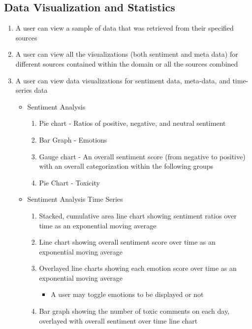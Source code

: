 \documentclass[12pt]{article}
\begin{document}
\subsection{Data Visualization and Statistics}
\begin{enumerate}
  \item A user can view a sample of data that was retrieved from their specified sources
  \item A user can view all the visualizations (both sentiment and meta data) for different sources contained within the domain or all the sources combined
  \item A user can view data visualizations for sentiment data, meta-data, and time-series data
        \begin{itemize}
          \item Sentiment Analysis
                \begin{enumerate}
                  \item Pie chart - Ratios of positive, negative, and neutral sentiment
                  \item Bar Graph - Emotions
                  \item Gauge chart - An overall sentiment score (from negative to positive) with an
                        overall categorization within the following groups
                  \item Pie Chart - Toxicity
                \end{enumerate}
          \item Sentiment Analysis Time Series
                \begin{enumerate}
                  \item Stacked, cumulative area line chart showing sentiment ratios over time as an exponential moving average
                  \item Line chart showing overall sentiment score over time as an exponential moving average
                  \item Overlayed line charts showing each emotion score over time as an exponential moving average \begin{itemize}
                    \item A user may toggle emotions to be displayed or not
                  \end{itemize}
                  \item Bar graph showing the number of toxic comments on each day, overlayed with overall sentiment over time line chart \begin{itemize}

\end{itemize}
\end{enumerate}
\end{itemize}
\end{enumerate}
\end{document}
